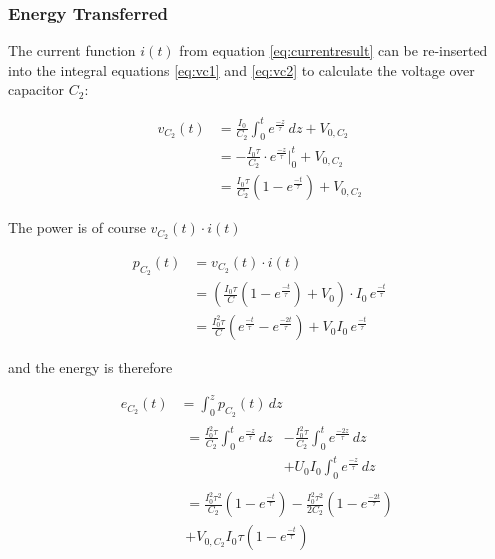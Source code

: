 \subsubsection{Energy Transferred}

The  current function  $i(t)$  from  equation  \ref{eq:currentresult}  can  be
re-inserted  into  the integral equations  \ref{eq:vc1}  and  \ref{eq:vc2}  to
calculate the voltage over capacitor $C_2$:

\begin{align}
    v_{C_2}(t) &= \frac{I_0}{C_2} \int_0^t e^\frac{-z}{\tau}\,dz + V_{0,C_2}\\
               &= -\frac{I_0\tau}{C_2} \cdot e^\frac{-z}{\tau} \bigg|_0^t + V_{0,C_2} \\
               &= \frac{I_0\tau}{C_2}\left(1-e^\frac{-t}{\tau}\right) + V_{0,C_2}
\end{align}

The power is of course $v_{C_2}(t) \cdot i(t)$

\begin{align}
    p_{C_2}(t) &= v_{C_2}(t)\cdot i(t) \\
               &= \left( \frac{I_0\tau}{C}\left(1 - e^\frac{-t}{\tau}\right) + V_0 \right) \cdot I_0\,e^\frac{-t}{\tau} \\
               &= \frac{I_0^2\tau}{C}\left(e^\frac{-t}{\tau}-e^\frac{-2t}{\tau}\right) + V_0I_0\,e^\frac{-t}{\tau}
\end{align}

and the energy is therefore

\begin{align}
    e_{C_2}(t) &= \int_0^z p_{C_2}(t)\,dz \\
               & \begin{aligned}
                   = \frac{I_0^2\tau}{C_2}\int_0^t e^\frac{-z}{\tau}\,dz &- \frac{I_0^2\tau}{C_2}\int_0^t e^\frac{-2z}{\tau}\,dz \\
                                                                         &+ U_0I_0\int_0^t e^\frac{-z}{\tau}\,dz
                 \end{aligned} \\
               & \begin{aligned}
                   = \frac{I_0^2\tau^2}{C_2}\left(1-e^\frac{-t}{\tau}\right) - \frac{I_0^2\tau^2}{2C_2}\left(1-e^\frac{-2t}{\tau}\right) \\
                                                                             + V_{0,C_2}I_0\tau\left(1-e^\frac{-t}{\tau}\right)
                 \end{aligned}
\end{align}

